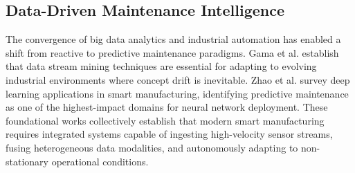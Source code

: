 

\subsection{Data-Driven Maintenance Intelligence}


The convergence of big data analytics and industrial automation has enabled a shift from reactive to predictive maintenance paradigms. Gama et al. \cite{Gama2014} establish that data stream mining techniques are essential for adapting to evolving industrial environments where concept drift is inevitable. Zhao et al. \cite{Zhao2019} survey deep learning applications in smart manufacturing, identifying predictive maintenance as one of the highest-impact domains for neural network deployment. These foundational works collectively establish that modern smart manufacturing requires integrated systems capable of ingesting high-velocity sensor streams, fusing heterogeneous data modalities, and autonomously adapting to non-stationary operational conditions.

